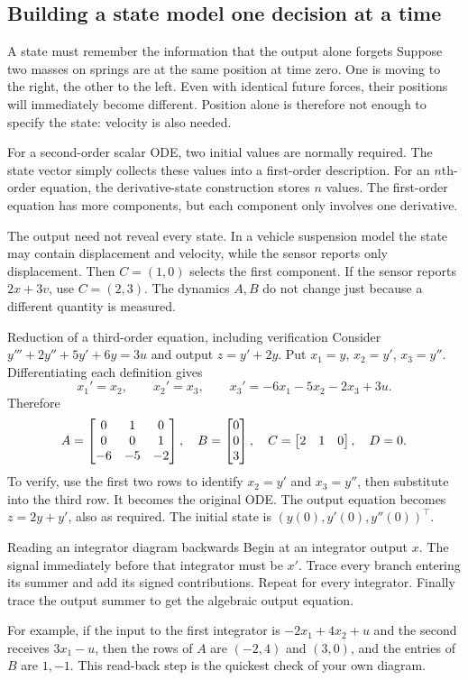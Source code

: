 \subsection{Building a state model one decision at a time}
\begin{concept}{A state must remember the information that the output alone forgets}
Suppose two masses on springs are at the same position at time zero. One is moving to the right, the other to the left. Even with identical future forces, their positions will immediately become different. Position alone is therefore not enough to specify the state: velocity is also needed.

For a second-order scalar ODE, two initial values are normally required. The state vector simply collects these values into a first-order description. For an $n$th-order equation, the derivative-state construction stores $n$ values. The first-order equation has more components, but each component only involves one derivative.

The output need not reveal every state. In a vehicle suspension model the state may contain displacement and velocity, while the sensor reports only displacement. Then $C=(1,0)$ selects the first component. If the sensor reports $2x+3v$, use $C=(2,3)$. The dynamics $A,B$ do not change just because a different quantity is measured.
\end{concept}
\begin{worked}{Reduction of a third-order equation, including verification}
Consider $y'''+2y''+5y'+6y=3u$ and output $z=y'+2y$. Put $x_1=y$, $x_2=y'$, $x_3=y''$. Differentiating each definition gives
\[x_1'=x_2,\qquad x_2'=x_3,\qquad x_3'=-6x_1-5x_2-2x_3+3u.\]
Therefore
\[A=\begin{bmatrix}0&1&0\\0&0&1\\-6&-5&-2\end{bmatrix},\quad B=\begin{bmatrix}0\\0\\3\end{bmatrix},\quad C=\begin{bmatrix}2&1&0\end{bmatrix},\quad D=0.\]
To verify, use the first two rows to identify $x_2=y'$ and $x_3=y''$, then substitute into the third row. It becomes the original ODE. The output equation becomes $z=2y+y'$, also as required. The initial state is $(y(0),y'(0),y''(0))^{\top}$.
\end{worked}
\begin{concept}{Reading an integrator diagram backwards}
Begin at an integrator output $x$. The signal immediately before that integrator must be $x'$. Trace every branch entering its summer and add its signed contributions. Repeat for every integrator. Finally trace the output summer to get the algebraic output equation.

For example, if the input to the first integrator is $-2x_1+4x_2+u$ and the second receives $3x_1-u$, then the rows of $A$ are $(-2,4)$ and $(3,0)$, and the entries of $B$ are $1,-1$. This read-back step is the quickest check of your own diagram.
\end{concept}
